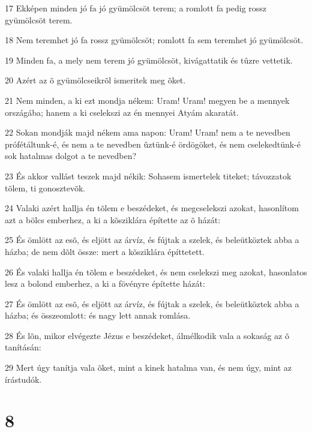 \par 17 Ekképen minden jó fa jó gyümölcsöt terem; a romlott fa pedig rossz gyümölcsöt terem.
\par 18 Nem teremhet jó fa rossz gyümölcsöt; romlott fa sem teremhet jó gyümölcsöt.
\par 19 Minden fa, a mely nem terem jó gyümölcsöt, kivágattatik és tûzre vettetik.
\par 20 Azért az õ gyümölcseikrõl ismeritek meg õket.
\par 21 Nem minden, a ki ezt mondja nékem: Uram! Uram! megyen be a mennyek országába; hanem a ki cselekszi az én mennyei Atyám akaratát.
\par 22 Sokan mondják majd nékem ama napon: Uram! Uram! nem a te nevedben prófétáltunk-é, és nem a te nevedben ûztünk-é ördögöket, és nem cselekedtünk-é sok hatalmas dolgot a te nevedben?
\par 23 És akkor vallást teszek majd nékik: Sohasem ismertelek titeket; távozzatok tõlem, ti gonosztevõk.
\par 24 Valaki azért hallja én tõlem e beszédeket, és megcselekszi azokat, hasonlítom azt a bölcs emberhez, a ki a kõsziklára építette az õ házát:
\par 25 És ömlött az esõ, és eljött az árvíz, és fújtak a szelek, és beleütköztek abba a házba; de nem dõlt össze: mert a kõsziklára építtetett.
\par 26 És valaki hallja én tõlem e beszédeket, és nem cselekszi meg azokat, hasonlatos lesz a bolond emberhez, a ki a fövényre építette házát:
\par 27 És ömlött az esõ, és eljött az árvíz, és fújtak a szelek, és beleütköztek abba a házba; és összeomlott: és nagy lett annak romlása.
\par 28 És lõn, mikor elvégezte Jézus e beszédeket, álmélkodik vala a sokaság az õ tanításán:
\par 29 Mert úgy tanítja vala õket, mint a kinek hatalma van, és nem úgy, mint az írástudók.

\chapter{8}

